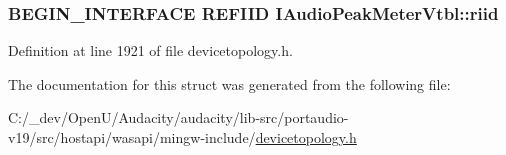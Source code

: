 \subsubsection[{\texorpdfstring{riid}{riid}}]{\setlength{\rightskip}{0pt plus 5cm}B\+E\+G\+I\+N\+\_\+\+I\+N\+T\+E\+R\+F\+A\+CE {\bf R\+E\+F\+I\+ID} I\+Audio\+Peak\+Meter\+Vtbl\+::riid}\hypertarget{struct_i_audio_peak_meter_vtbl_a9b2c38b623c060c59d2256b09fd5fdb5}{}\label{struct_i_audio_peak_meter_vtbl_a9b2c38b623c060c59d2256b09fd5fdb5}


Definition at line 1921 of file devicetopology.\+h.



The documentation for this struct was generated from the following file\+:\begin{DoxyCompactItemize}
\item 
C\+:/\+\_\+dev/\+Open\+U/\+Audacity/audacity/lib-\/src/portaudio-\/v19/src/hostapi/wasapi/mingw-\/include/\hyperlink{devicetopology_8h}{devicetopology.\+h}\end{DoxyCompactItemize}
